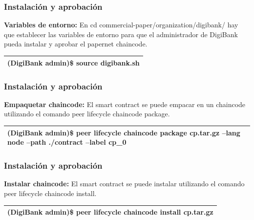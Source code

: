 \documentclass{beamer}
\begin{document}
	\begin{frame}
		\frametitle{Instalación y aprobación}
		\textbf{Variables de entorno:} En cd commercial-paper/organization/digibank/ hay que establecer las variables de entorno para que el administrador de DigiBank pueda instalar y aprobar el papernet chaincode.\\
		\begin{center}
			\begin{tabulary}{\linewidth}{L}
				\hline
				(DigiBank admin)\$ source digibank.sh\\
				\hline
			\end{tabulary} 
		\end{center}
	\end{frame}
	
	\begin{frame}
		\frametitle{Instalación y aprobación}
		\textbf{Empaquetar chaincode:} El smart contract se puede empacar en un chaincode utilizando el comando peer lifecycle chaincode package.\\
		\begin{center}
			\begin{tabulary}{\linewidth}{L}
				\hline
				(DigiBank admin)\$ peer lifecycle chaincode package cp.tar.gz --lang node --path ./contract --label cp\_0\\
				\hline
			\end{tabulary} 
		\end{center}
	\end{frame}
	
	\begin{frame}
		\frametitle{Instalación y aprobación}
		\textbf{Instalar chaincode:} El smart contract se puede instalar utilizando el comando peer lifecycle chaincode install.\\
		\begin{center}
			\begin{tabulary}{\linewidth}{L}
				\hline
				(DigiBank admin)\$ peer lifecycle chaincode install cp.tar.gz\\
				\hline
			\end{tabulary} 
		\end{center}
	\end{frame}
	
\end{document}
